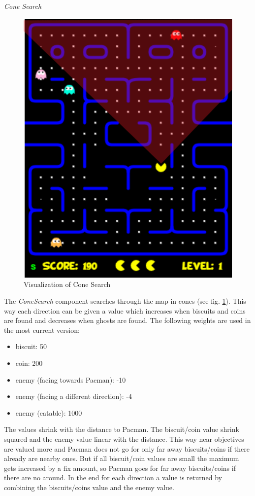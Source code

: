 \emph{Cone Search} \newline
\begin{figure}
	\label{fig:cone}
	\centering
	\includegraphics[scale=0.65]{pictures/Pacman/Cone.png}
	\caption{Visualization of Cone Search}
\end{figure}
The \textit{ConeSearch} component searches through the map in cones (see fig. \ref{fig:cone}). This way each direction can be given a value which increases when biscuits and coins are found and decreases when ghosts are found. The following weights are used in the most current version:
\begin{itemize}
	\item biscuit: 50
	\item coin: 200
	\item enemy (facing towards Pacman): -10
	\item enemy (facing a different direction): -4
	\item enemy (eatable): 1000
\end{itemize}
The values shrink with the distance to Pacman. The biscuit/coin value shrink squared and the enemy value linear with the distance. This way near objectives are valued more and Pacman does not go for only far away biscuits/coins if there already are nearby ones. But if all biscuit/coin values are small the maximum gets increased by a fix amount, so Pacman goes for far away biscuits/coins if there are no around. In the end for each direction a value is returned by combining the biscuits/coins value and the enemy value. 
